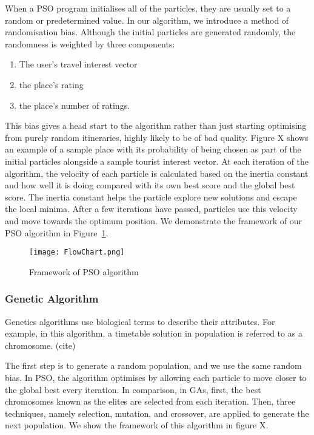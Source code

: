 When a PSO program initialises all of the particles,
they are usually set to a random or predetermined
value. In our algorithm, we introduce a method of
randomisation bias. Although the initial particles are
generated randomly, the randomness is weighted 
by three components: 
\begin{enumerate}
    
    \item The user's travel interest vector 
    \item the place's rating 
    \item the place's number of ratings.

\end{enumerate}
This bias gives a
head start to the algorithm rather than just starting
optimising from purely random itineraries, highly
likely to be of bad quality. Figure X
shows an example of a sample place with its
probability of being chosen as part of the initial
particles alongside a sample tourist interest vector.
At each iteration of the algorithm, the velocity of
each particle is calculated based on the inertia
constant and how well it is doing compared with its
own best score and the global best score. The
inertia constant helps the particle explore new
solutions and escape the local minima. After a few
iterations have passed, particles use this velocity
and move towards the optimum position. We demonstrate
the framework of our PSO algorithm in Figure~\ref{FlowChart}.

\begin{figure}[h]
\centering
\texttt{[image: FlowChart.png]}
\caption{Framework of PSO algorithm}
\label{FlowChart}
\end{figure}

\subsubsection{Genetic Algorithm}
Genetics algorithms use biological terms to describe
their attributes. For example, in this algorithm, a
timetable solution in population is referred to as a
chromosome. (cite)

The first step is to generate a random population, and
we use the same random bias. In PSO, the algorithm
optimises by allowing each particle to move closer to
the global best every iteration. In comparison, in
GAs, first, the best chromosomes known as the elites
are selected from each iteration. Then, three
techniques, namely selection, mutation, and crossover,
are applied to generate the next population. We show
the framework of this algorithm in figure X. 

